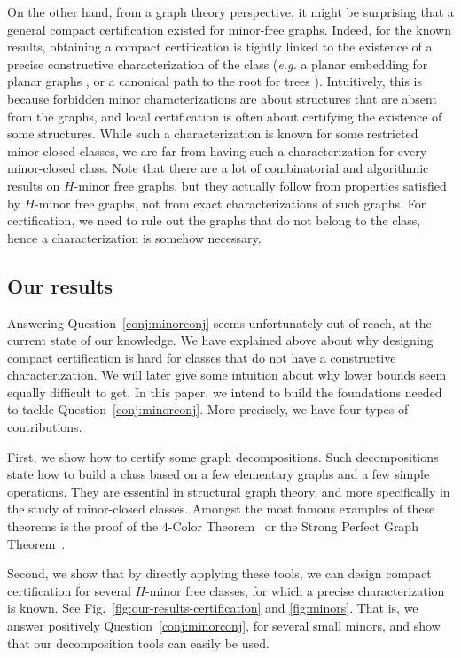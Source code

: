 \documentclass[a4paper,thm-restate,USenglish]{lipics-v2019}
\begin{document}
On the other hand, from a graph theory perspective, it might be surprising that a general compact certification existed for minor-free graphs. 
Indeed, for the known results, obtaining a compact certification  is tightly linked to the existence of a precise constructive characterization of the class (\emph{e.g.} a planar embedding for planar graphs \cite{FeuilloleyFMRRT20, EsperetL21}, or a canonical path to the root for trees \cite{KormanKP10}). Intuitively, this is because forbidden minor characterizations are about structures that are absent from the graphs, and local certification is often about certifying the existence of some structures.
While such a characterization is known for some restricted minor-closed classes, we are far from having such a characterization for every minor-closed class. 
Note that there are a lot of combinatorial and algorithmic results on $H$-minor free graphs, but they actually follow from properties satisfied by $H$-minor free graphs, not from exact characterizations of such graphs. For certification, we need to rule out the graphs that do not belong to the class, hence a characterization is somehow necessary. 


\subsection{Our results}

Answering Question~\ref{conj:minorconj} seems unfortunately out of reach, at the current state of our knowledge. We have explained above about why designing compact certification is hard for classes that do not have  a constructive characterization. We will later give some intuition about why lower bounds seem equally difficult to get. 
In this paper, we intend to build the foundations needed to tackle Question~\ref{conj:minorconj}. 
More precisely, we have four types of contributions. 

First, we show how to certify some graph decompositions. Such decompositions state how to build a class based on a few elementary graphs and a few simple operations. 
They are essential in structural graph theory, and more specifically in the study of minor-closed classes. 
Amongst the most famous examples of these theorems is the proof of the $4$-Color Theorem~\cite{appel1976every} or the Strong Perfect Graph Theorem~\cite{chudnovsky2006strong}.  

Second, we show that by directly applying these tools, we can design compact certification for several $H$-minor free classes, for which a precise characterization is known. See Fig.~\ref{fig:our-results-certification} and \ref{fig:minors}. That is, we answer positively Question~\ref{conj:minorconj}, for several small minors, and show that our decomposition tools can easily be used.
\end{document}
